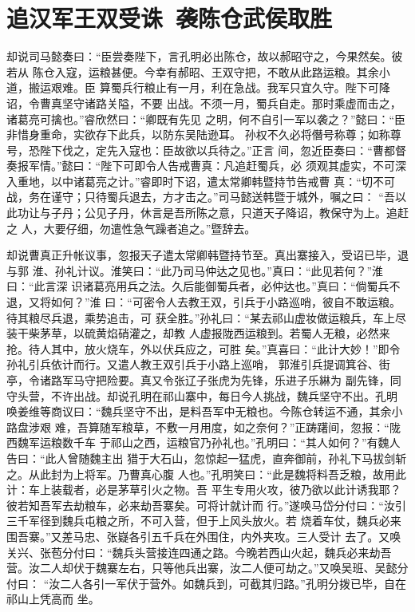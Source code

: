 \chapter{追汉军王双受诛~袭陈仓武侯取胜}

却说司马懿奏曰：“臣尝奏陛下，言孔明必出陈仓，故以郝昭守之，今果然矣。彼若从
陈仓入寇，运粮甚便。今幸有郝昭、王双守把，不敢从此路运粮。其余小道，搬运艰难。臣
算蜀兵行粮止有一月，利在急战。我军只宜久守。陛下可降诏，令曹真坚守诸路关隘，不要
出战。不须一月，蜀兵自走。那时乘虚而击之，诸葛亮可擒也。”睿欣然曰：“卿既有先见
之明，何不自引一军以袭之？”懿曰：“臣非惜身重命，实欲存下此兵，以防东吴陆逊耳。
孙权不久必将僭号称尊；如称尊号，恐陛下伐之，定先入寇也：臣故欲以兵待之。”正言
间，忽近臣奏曰：“曹都督奏报军情。”懿曰：“陛下可即令人告戒曹真：凡追赶蜀兵，必
须观其虚实，不可深入重地，以中诸葛亮之计。”睿即时下诏，遣太常卿韩暨持节告戒曹
真：“切不可战，务在谨守；只待蜀兵退去，方才击之。”司马懿送韩暨于城外，嘱之曰：
“吾以此功让与子丹；公见子丹，休言是吾所陈之意，只道天子降诏，教保守为上。追赶之
人，大要仔细，勿遣性急气躁者追之。”暨辞去。

却说曹真正升帐议事，忽报天子遣太常卿韩暨持节至。真出寨接入，受诏已毕，退与郭
淮、孙礼计议。淮笑曰：“此乃司马仲达之见也。”真曰：“此见若何？”淮曰：“此言深
识诸葛亮用兵之法。久后能御蜀兵者，必仲达也。”真曰：“倘蜀兵不退，又将如何？”淮
曰：“可密令人去教王双，引兵于小路巡哨，彼自不敢运粮。待其粮尽兵退，乘势追击，可
获全胜。”孙礼曰：“某去祁山虚妆做运粮兵，车上尽装干柴茅草，以硫黄焰硝灌之，却教
人虚报陇西运粮到。若蜀人无粮，必然来抢。待人其中，放火烧车，外以伏兵应之，可胜
矣。”真喜曰：“此计大妙！”即令孙礼引兵依计而行。又遣人教王双引兵于小路上巡哨，
郭淮引兵提调箕谷、街亭，令诸路军马守把险要。真又令张辽子张虎为先锋，乐进子乐綝为
副先锋，同守头营，不许出战。却说孔明在祁山寨中，每日今人挑战，魏兵坚守不出。孔明
唤姜维等商议曰：“魏兵坚守不出，是料吾军中无粮也。今陈仓转运不通，其余小路盘涉艰
难，吾算随军粮草，不敷一月用度，如之奈何？”正踌躇间，忽报：“陇西魏军运粮数千车
于祁山之西，运粮官乃孙礼也。”孔明曰：“其人如何？”有魏人告曰：“此人曾随魏主出
猎于大石山，忽惊起一猛虎，直奔御前，孙礼下马拔剑斩之。从此封为上将军。乃曹真心腹
人也。”孔明笑曰：“此是魏将料吾乏粮，故用此计：车上装载者，必是茅草引火之物。吾
平生专用火攻，彼乃欲以此计诱我耶？彼若知吾军去劫粮车，必来劫吾寨矣。可将计就计而
行。”遂唤马岱分付曰：“汝引三千军径到魏兵屯粮之所，不可入营，但于上风头放火。若
烧着车仗，魏兵必来围吾寨。”又差马忠、张嶷各引五千兵在外围住，内外夹攻。三人受计
去了。又唤关兴、张苞分付曰：“魏兵头营接连四通之路。今晚若西山火起，魏兵必来劫吾
营。汝二人却伏于魏寨左右，只等他兵出寨，汝二人便可劫之。”又唤吴班、吴懿分付曰：
“汝二人各引一军伏于营外。如魏兵到，可截其归路。”孔明分拨已毕，自在祁山上凭高而
坐。

